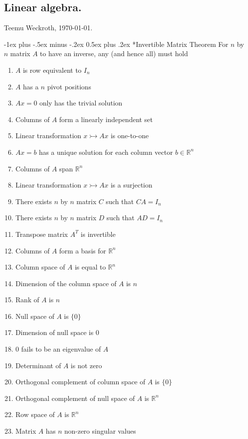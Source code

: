 \documentclass[10pt,landscape,a4paper]{article}
\makeatletter
\renewcommand{\section}{\@startsection{section}{1}{0mm}%
	{-1ex plus -.5ex minus -.2ex}%
	{0.5ex plus .2ex}%
	{\normalfont\large\bfseries}}
\makeatother
\begin{document}
	
	\raggedright
	\footnotesize
	\begin{multicols}{3}
		
		
	\setlength{\premulticols}{1pt}
	\setlength{\postmulticols}{1pt}
	\setlength{\multicolsep}{1pt}
	\setlength{\columnsep}{2pt}
	
	\part*{Linear algebra.}
	\begin{center}
		Teemu Weckroth, \today.
	\end{center}
	
	\section*{Invertible Matrix Theorem}
	For $n$ by $n$ matrix $A$ to have an inverse, any (and hence all) must hold
	\begin{enumerate}
		\item $A$ is row equivalent to $I_n$
		\item $A$ has a $n$ pivot positions
		\item $Ax = 0$ only has the trivial solution
		\item Columns of $A$ form a linearly independent set
		\item Linear transformation $x \rightarrowtail Ax$ is one-to-one
		\item $Ax = b$ has a unique solution for each column vector $b \in \mathbb{R}^n$
		\item Columns of $A$ span $\mathbb{R}^n$
		\item Linear transformation $x \rightarrowtail Ax$ is a surjection
		\item There exists $n$ by $n$ matrix $C$ such that $CA = I_n$
		\item There exists $n$ by $n$ matrix $D$ such that $AD = I_n$
		\item Transpose matrix $A^T$ is invertible
		\item Columns of $A$ form a basis for $\mathbb{R}^n$
		\item Column space of $A$ is equal to $\mathbb{R}^n$
		\item Dimension of the column space of $A$ is $n$
		\item Rank of $A$ is $n$
		\item Null space of $A$ is $\{0\}$
		\item Dimension of null space is $0$
		\item $0$ fails to be an eigenvalue of $A$
		\item Determinant of $A$ is not zero
		\item Orthogonal complement of column space of $A$ is $\{0\}$
		\item Orthogonal complement of null space of $A$ is $\mathbb{R}^n$
		\item Row space of $A$ is $\mathbb{R}^n$
		\item Matrix $A$ has $n$ non-zero singular values
	\end{enumerate}
	

\end{multicols}
\end{document}
